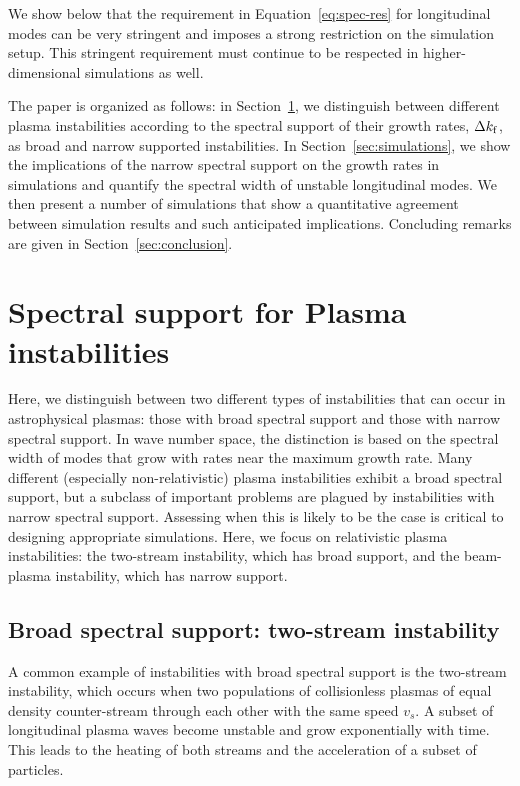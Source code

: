 \documentclass[pop,numberedappendix,iop]{aeb_emulateapj_2015}
\begin{document}

We show below that the requirement in Equation~\eqref{eq:spec-res} for longitudinal modes can be very stringent and  imposes a strong restriction on the simulation setup. 
This stringent requirement must continue to be respected in higher-dimensional simulations as well.
 
 


The paper is organized as follows:
in Section~\ref{sec:resolution}, we distinguish between different plasma instabilities according to the spectral support of their growth rates, $\Delta k_{\rm f}$, as broad and narrow supported instabilities.
In Section~\ref{sec:simulations}, we show the implications of the narrow spectral support on the growth rates in simulations and quantify the spectral width of unstable longitudinal modes. We then present a number of simulations that show a quantitative agreement between simulation results and such anticipated implications. Concluding remarks are given in Section~\ref{sec:conclusion}.
 

\section{Spectral support for Plasma instabilities}
\label{sec:resolution}

Here, we distinguish between two different types of instabilities that can occur in astrophysical plasmas: those with broad spectral support and those with narrow spectral support. In wave number space, the distinction is based on the spectral width of modes that grow with rates near the maximum growth rate.
Many different (especially non-relativistic) plasma instabilities exhibit a broad spectral support, but a subclass of important problems are plagued by instabilities with narrow spectral support. 
Assessing when this is likely to be the case is critical to designing appropriate simulations.
Here, we focus on relativistic plasma instabilities: the two-stream instability, which has broad support, and the beam-plasma instability, which has narrow support. 


\subsection{Broad spectral support: two-stream instability}



A common example of instabilities with broad spectral support is the two-stream instability, which occurs when two populations of collisionless plasmas of equal density counter-stream through each other with the same speed $v_s$. A subset of longitudinal plasma waves become unstable and grow exponentially with time. This leads to the heating of both streams and the acceleration of a subset of particles.
\end{document}
